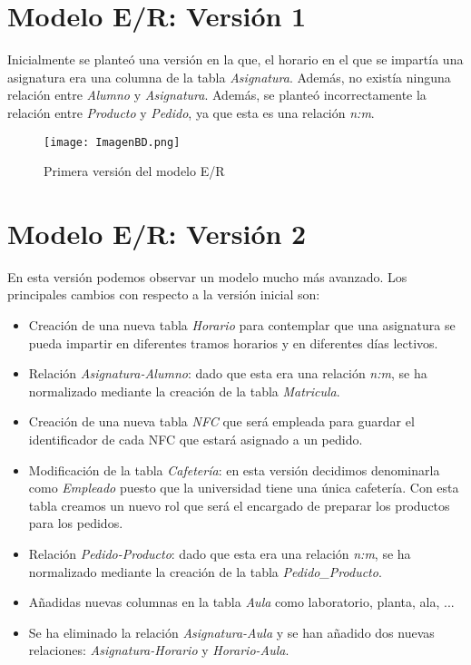 \documentclass[12pt]{report}
\begin{document}
\section{Modelo E/R: Versión 1}
Inicialmente se planteó una versión en la que, el horario en el que se impartía una asignatura era una columna de la tabla \textit{Asignatura}. Además, no existía ninguna relación entre \textit{Alumno} y \textit{Asignatura}. Además, se planteó incorrectamente la relación entre \textit{Producto} y \textit{Pedido}, ya que esta es una relación \textit{n:m}.

\begin{figure}[H]
    \centering
    \texttt{[image: ImagenBD.png]}
    \caption{Primera versión del modelo E/R}
    \label{fig:Figura4}
\end{figure}
\newpage
\section{Modelo E/R: Versión 2}
En esta versión podemos observar un modelo mucho más avanzado. Los principales cambios con respecto a la versión inicial son:

\begin{itemize}
    \item Creación de una nueva tabla \textit{Horario} para contemplar que una asignatura se pueda impartir en diferentes tramos horarios y en diferentes días lectivos.
    \item Relación \textit{Asignatura-Alumno}: dado que esta era una relación \textit{n:m}, se ha normalizado mediante la creación de la tabla \textit{Matricula}.
    \item Creación de una nueva tabla \textit{NFC} que será empleada para guardar el identificador de cada NFC que estará asignado a un pedido.
    \item Modificación de la tabla \textit{Cafetería}: en esta versión decidimos denominarla como \textit{Empleado} puesto que la universidad tiene una única cafetería. Con esta tabla creamos un nuevo rol que será el encargado de preparar los productos para los pedidos.
    \item Relación \textit{Pedido-Producto}: dado que esta era una relación \textit{n:m}, se ha normalizado mediante la creación de la tabla \textit{Pedido\_Producto}.
    \item Añadidas nuevas columnas en la tabla \textit{Aula} como laboratorio, planta, ala, ...
    \item Se ha eliminado la relación \textit{Asignatura-Aula} y se han añadido dos nuevas relaciones: \textit{Asignatura-Horario} y \textit{Horario-Aula}.
\end{itemize}  
\end{document}

